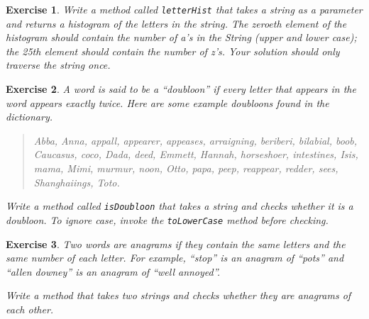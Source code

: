 \documentclass[12pt]{book}
\theoremstyle{exercise}
\newtheorem{exercise}{Exercise}[chapter]
\newcommand{\java}[1]{\verb"#1"}
\begin{document}
\begin{exercise}
Write a method called \java{letterHist} that takes a string as a parameter and returns a histogram of the letters in the string.
The zeroeth element of the histogram should contain the number of a's in the String (upper and lower case); the 25th element should contain the number of z's.
Your solution should only traverse the string once.
\end{exercise}





\begin{exercise}

A word is said to be a ``doubloon'' if every letter that appears in the word appears exactly twice.
Here are some example doubloons found in the dictionary.

\begin{quote}
Abba, Anna, appall, appearer, appeases, arraigning, beriberi, bilabial, boob, Caucasus, coco, Dada, deed, Emmett, Hannah, horseshoer, intestines, Isis, mama, Mimi, murmur, noon, Otto, papa, peep, reappear, redder, sees, Shanghaiings, Toto.
\end{quote}

Write a method called \java{isDoubloon} that takes a string and checks whether it is a doubloon.
To ignore case, invoke the \java{toLowerCase} method before checking.
\end{exercise}


\begin{exercise}

Two words are anagrams if they contain the same letters and the same number of each letter.
For example, ``stop'' is an anagram of ``pots'' and ``allen downey'' is an anagram of ``well annoyed''.

Write a method that takes two strings and checks whether they are anagrams of each other.
\end{exercise}
\end{document}

